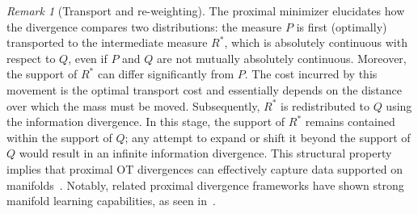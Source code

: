 \documentclass{amsart}
\newcommand{\rb}[1]{#1} %
\theoremstyle{definition}
\theoremstyle{remark}
\newtheorem{remark}[theorem]{Remark}
\numberwithin{equation}{section}
\begin{document}
\begin{remark}[Transport and re-weighting]\label{remark:Transport and re-weighting} The proximal minimizer \rb{elucidates how the divergence compares two distributions}: the measure $P$ is first (optimally) transported to the intermediate measure $R^*$, which is absolutely continuous with respect to $Q$, even if $P$ and $Q$ are not mutually absolutely continuous. Moreover, the support of $R^*$ can differ significantly from $P$. The cost incurred by this movement is the optimal transport cost and essentially depends on the distance over which the mass must be moved. Subsequently, $R^*$ is redistributed to $Q$ using the information divergence. In this stage, the support of $R^*$ remains contained within the support of $Q$; any attempt to expand or shift it beyond the support of $Q$ would result in an infinite information divergence. This structural property implies that proximal OT divergences can effectively capture data supported on manifolds~\cite{gu2024combining}. %
Notably, related proximal divergence frameworks have shown strong manifold learning capabilities, as seen in~\cite{birrell2022f, birrell2023adversarially, pidstrigach2022score, zhang2024wasserstein}.  
\end{remark}
\end{document}
